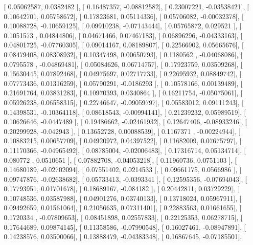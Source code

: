 \documentclass{article}
\begin{document}
       [ 0.05062587,  0.0382482 ],
       [ 0.16487357, -0.08812582],
       [ 0.23007221, -0.03538421],
       [ 0.10642701,  0.05758672],
       [ 0.17823681,  0.05114336],
       [ 0.05706082, -0.00032378],
       [ 0.10088728, -0.10659125],
       [ 0.09910238, -0.07143444],
       [ 0.05765872,  0.029521  ],
       [ 0.1051573 ,  0.04844806],
       [ 0.04671466,  0.07467183],
       [ 0.06896296, -0.04333163],
       [ 0.04801725, -0.07760305],
       [ 0.09014167,  0.08189807],
       [ 0.22566902,  0.05665676],
       [ 0.08479408,  0.08308932],
       [ 0.10347498,  0.00650793],
       [ 0.1180562 , -0.04068086],
       [ 0.0795578 , -0.04869481],
       [ 0.05084626,  0.06714757],
       [ 0.17923759,  0.03509268],
       [ 0.15630445,  0.07892468],
       [ 0.04975697,  0.02717733],
       [ 0.22695932,  0.08849742],
       [ 0.07773436,  0.01316259],
       [ 0.05790291, -0.0186293 ],
       [ 0.10578166,  0.00139489],
       [ 0.21691764,  0.03831283],
       [ 0.10970393,  0.0340864 ],
       [ 0.16211754, -0.05075061],
       [ 0.05926238,  0.06558315],
       [ 0.22746647, -0.09059797],
       [ 0.05583012,  0.09111243],
       [ 0.14398531, -0.10364118],
       [ 0.08618543, -0.00994141],
       [ 0.21239232,  0.05989519],
       [ 0.10626646, -0.0447489 ],
       [ 0.19486662, -0.02461932],
       [ 0.12647406, -0.08933246],
       [ 0.20299928, -0.042943  ],
       [ 0.13652728,  0.00088539],
       [ 0.1167371 , -0.00224944],
       [ 0.10883215,  0.00657709],
       [ 0.04920972,  0.04397522],
       [ 0.11682009,  0.07675797],
       [ 0.11170366, -0.04965492],
       [ 0.08785004, -0.02006483],
       [ 0.17316714,  0.05134714],
       [ 0.080772  ,  0.0510651 ],
       [ 0.07882708, -0.04053218],
       [ 0.11960736,  0.0751103 ],
       [ 0.14680189, -0.02702094],
       [ 0.07551402,  0.0214533 ],
       [ 0.09661175,  0.0566986 ],
       [ 0.09747876, -0.02638682],
       [ 0.05733413, -0.0393341 ],
       [ 0.12595356, -0.07694043],
       [ 0.17793951,  0.01701678],
       [ 0.18689167, -0.084182  ],
       [ 0.20442811,  0.03729229],
       [ 0.10748536,  0.03587988],
       [ 0.04901276,  0.03740133],
       [ 0.13718024,  0.05967911],
       [ 0.09492659,  0.01561064],
       [ 0.21056635,  0.07311401],
       [ 0.22883563,  0.01661655],
       [ 0.1720334 , -0.07809653],
       [ 0.08451898,  0.02557833],
       [ 0.22125353,  0.06278715],
       [ 0.17644689,  0.09874145],
       [ 0.11358586, -0.07990548],
       [ 0.16027461, -0.08947891],
       [ 0.14238576,  0.03500066],
       [ 0.13888479, -0.04383348],
       [ 0.16867645, -0.07185501],
\end{document}
